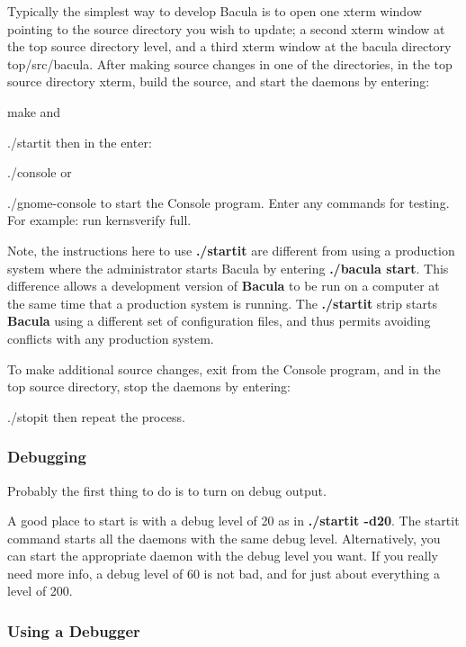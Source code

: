 Typically the simplest way to develop Bacula is to open one xterm window
pointing to the source directory you wish to update; a second xterm window at
the top source directory level, and a third xterm window at the bacula
directory \lt{}top\gt{}/src/bacula. After making source changes in one of the
directories, in the top source directory xterm, build the source, and start
the daemons by entering: 

make and 

./startit then in the enter: 

./console or 

./gnome-console to start the Console program. Enter any commands for testing.
For example: run kernsverify full. 

Note, the instructions here to use {\bf ./startit} are different from using a
production system where the administrator starts Bacula by entering {\bf
./bacula start}. This difference allows a development version of {\bf Bacula}
to be run on a computer at the same time that a production system is running.
The {\bf ./startit} strip starts {\bf Bacula} using a different set of
configuration files, and thus permits avoiding conflicts with any production
system. 

To make additional source changes, exit from the Console program, and in the
top source directory, stop the daemons by entering: 

./stopit then repeat the process. 

\subsubsection*{Debugging}

Probably the first thing to do is to turn on debug output. 

A good place to start is with a debug level of 20 as in {\bf ./startit -d20}.
The startit command starts all the daemons with the same debug level.
Alternatively, you can start the appropriate daemon with the debug level you
want. If you really need more info, a debug level of 60 is not bad, and for
just about everything a level of 200. 

\subsubsection*{Using a Debugger}

